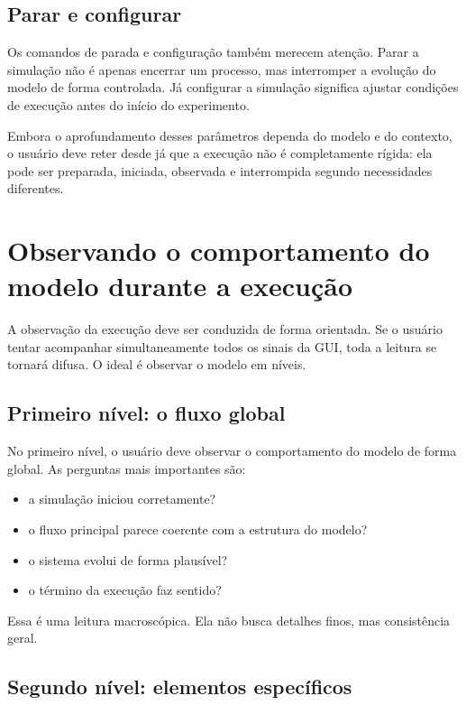 \subsection{Parar e configurar}
\label{subsec:cap5_parar_configurar}

Os comandos de parada e configuração também merecem atenção. Parar a simulação não é apenas encerrar um processo, mas interromper a evolução do modelo de forma controlada. Já configurar a simulação significa ajustar condições de execução antes do início do experimento.

Embora o aprofundamento desses parâmetros dependa do modelo e do contexto, o usuário deve reter desde já que a execução não é completamente rígida: ela pode ser preparada, iniciada, observada e interrompida segundo necessidades diferentes.

\section{Observando o comportamento do modelo durante a execução}
\label{sec:cap5_observando_comportamento_execucao}

A observação da execução deve ser conduzida de forma orientada. Se o usuário tentar acompanhar simultaneamente todos os sinais da GUI, toda a leitura se tornará difusa. O ideal é observar o modelo em níveis.

\subsection{Primeiro nível: o fluxo global}
\label{subsec:cap5_primeiro_nivel_fluxo_global}

No primeiro nível, o usuário deve observar o comportamento do modelo de forma global. As perguntas mais importantes são:
\begin{itemize}
    \item a simulação iniciou corretamente?
    \item o fluxo principal parece coerente com a estrutura do modelo?
    \item o sistema evolui de forma plausível?
    \item o término da execução faz sentido?
\end{itemize}

Essa é uma leitura macroscópica. Ela não busca detalhes finos, mas consistência geral.

\subsection{Segundo nível: elementos específicos}
\label{subsec:cap5_segundo_nivel_elementos_especificos}

